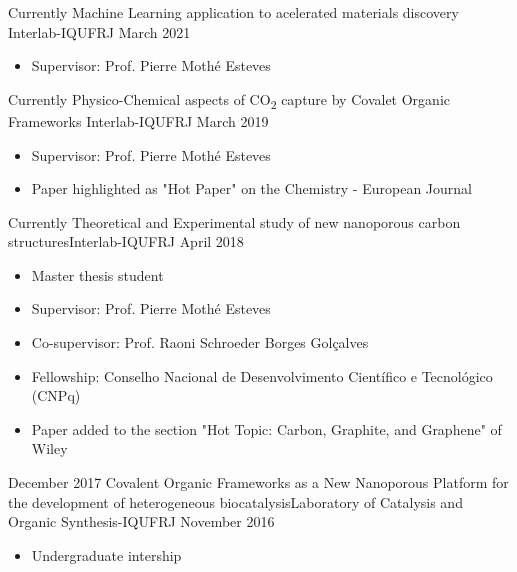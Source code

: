 %
%
%
\begin{experiences}
	\experience
	{Currently}   {Machine Learning application to acelerated materials discovery} {Interlab-IQ}{UFRJ}
	{March 2021} {
		\begin{itemize}
			\item Supervisor: Prof. Pierre Mothé Esteves      
		\end{itemize}
	}
	{}
	\emptySeparator
	
  \experience
  {Currently}   {Physico-Chemical aspects of CO\textsubscript{2} capture by Covalet Organic Frameworks} {Interlab-IQ}{UFRJ}
  {March 2019} {
  	\begin{itemize}
  		\item Supervisor: Prof. Pierre Mothé Esteves    
  		\item Paper highlighted as "Hot Paper" on the Chemistry - European Journal     
  	\end{itemize}
  }
  {}
    \emptySeparator
  \experience
	{Currently}   {Theoretical and Experimental study of new nanoporous carbon structures}{Interlab-IQ}{UFRJ}
	{April 2018} {
		\begin{itemize}
			\item Master thesis student
			\item Supervisor: Prof. Pierre Mothé Esteves  
            \item Co-supervisor: Prof. Raoni Schroeder Borges Golçalves                   
            \item Fellowship: Conselho Nacional de Desenvolvimento Científico e Tecnológico (CNPq)
            \item Paper added to the section "Hot Topic: Carbon, Graphite, and Graphene" of Wiley                                                                        
		\end{itemize}
	}
	{}
  \emptySeparator
  \experience
    {December 2017}   {Covalent Organic Frameworks as a New Nanoporous Platform for the development of heterogeneous biocatalysis}{Laboratory of Catalysis and Organic Synthesis-IQ}{UFRJ}
    {November 2016} {
                      \begin{itemize}
                      	\item Undergraduate intership

\end{itemize}}
\end{experiences}
